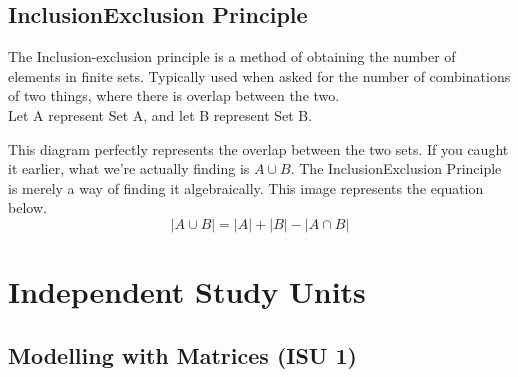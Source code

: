 \documentclass[final,1p,12pt]{elsarticle}
\begin{document}
    \subsection{Inclusion\textemdash Exclusion Principle}
    The Inclusion-exclusion principle is a method of obtaining the number of elements in finite sets. Typically used when asked for the number of combinations of two things, where there is overlap between the two.\\
    Let A represent Set A, and let B represent Set B.
    \begin{center}
    \end{center}
    This diagram perfectly represents the overlap between the two sets. If you caught it earlier, what we're actually finding is $A\cup B$. The Inclusion\textemdash Exclusion Principle is merely a way of finding it algebraically. This image represents the equation below.
    \begin{equation}
        |A\cup B| = |A| + |B| - |A\cap B|
    \end{equation}
    
\section{Independent Study Units}

    \subsection{Modelling with Matrices (ISU 1)}
    
\end{document}
